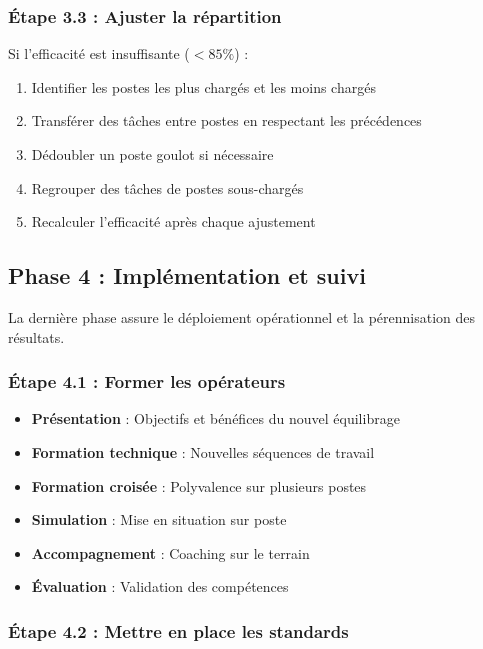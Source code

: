 \documentclass[12pt,a4paper]{article}
\newenvironment{methodbox}[1]
  {\begin{tcolorbox}[colback=blue!5!white, colframe=methodcolor, title=#1]\small}
  {\end{tcolorbox}}
\begin{document}
\subsubsection{Étape 3.3 : Ajuster la répartition}

Si l'efficacité est insuffisante ($< 85\%$) :
\begin{enumerate}
    \item Identifier les postes les plus chargés et les moins chargés
    \item Transférer des tâches entre postes en respectant les précédences
    \item Dédoubler un poste goulot si nécessaire
    \item Regrouper des tâches de postes sous-chargés
    \item Recalculer l'efficacité après chaque ajustement
\end{enumerate}

\subsection{Phase 4 : Implémentation et suivi}

La dernière phase assure le déploiement opérationnel et la pérennisation des résultats.

\subsubsection{Étape 4.1 : Former les opérateurs}

\begin{methodbox}{Plan de formation type}
\begin{itemize}
    \item \textbf{Présentation} : Objectifs et bénéfices du nouvel équilibrage
    \item \textbf{Formation technique} : Nouvelles séquences de travail
    \item \textbf{Formation croisée} : Polyvalence sur plusieurs postes
    \item \textbf{Simulation} : Mise en situation sur poste
    \item \textbf{Accompagnement} : Coaching sur le terrain
    \item \textbf{Évaluation} : Validation des compétences
\end{itemize}
\end{methodbox}

\subsubsection{Étape 4.2 : Mettre en place les standards}
\end{document}
